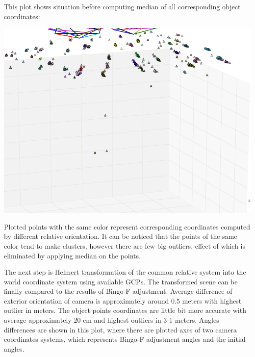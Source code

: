 \documentclass[a4paper,12pt]{article}
\begin{document}

This plot shows situation before computing median of all corresponding object coordinates:

\includegraphics[scale=0.45]{figures/before_median.png}

Plotted points with the same color represent corresponding coordinates computed by different relative orientation. It can be noticed that 
the points of the same color tend to make clusters, however there are few big outliers, effect of which is eliminated by applying
median on the points.

The next step is Helmert transformation of the common relative system into the world coordinate system using available GCPs.
The transformed scene can be finally compared to the results of Bingo-F adjustment.
Average difference of exterior orientation 
of camera is approximately around 0.5 meters with highest outlier in meters. The object points coordinates 
are little bit more accurate with average approximately 20 cm and highest outliers in 3-1 meters. 
Angles differences are shown in this plot, where there are plotted axes of two camera coordinates systems, which represents 
Bingo-F adjustment angles and the  initial angles. 

\end{document}
